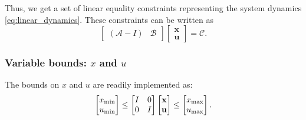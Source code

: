 \documentclass[a4paper,12pt,fleqn]{article}
\newcommand{\varxvec}{\mathbf{x}}
\newcommand{\varuvec}{\mathbf{u}}
\begin{document}
Thus, we get a set of linear equality constraints representing the system dynamics \eqref{eq:linear_dynamics}.
These constraints can be written as
\begin{equation}
 \begin{bmatrix}
  (\mathcal{A}-I) & \mathcal{B}
 \end{bmatrix}
 \begin{bmatrix}
  \varxvec\\
  \varuvec
 \end{bmatrix}
 = \mathcal{C}.
\end{equation}
\subsubsection{Variable bounds: $x$ and $u$}
The bounds on $x$ and $u$ are readily implemented as:
\begin{equation}
\begin{bmatrix}
 x_{\rm min}\\u_{\rm min}
\end{bmatrix}
\leq
\begin{bmatrix}
 I &0\\
 0 & I
\end{bmatrix}
\begin{bmatrix}
 \varxvec\\ \varuvec
\end{bmatrix}
\leq
\begin{bmatrix}
 x_{\rm max}\\u_{\rm max}
\end{bmatrix}.
\end{equation}
\end{document}
